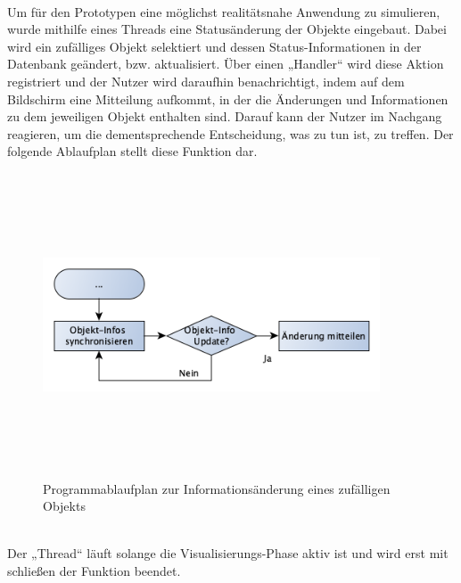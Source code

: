 \\
Um für den Prototypen eine möglichst realitätsnahe Anwendung zu simulieren, wurde mithilfe eines Threads eine Statusänderung der Objekte eingebaut. Dabei wird 
ein zufälliges Objekt selektiert und dessen Status-Informationen in der Datenbank geändert, bzw. aktualisiert. Über einen „Handler“ wird diese Aktion registriert 
und der Nutzer wird daraufhin benachrichtigt, indem auf dem Bildschirm eine Mitteilung aufkommt, in der die Änderungen und Informationen zu dem jeweiligen Objekt 
enthalten sind. Darauf kann der Nutzer im Nachgang reagieren, um die dementsprechende Entscheidung, was zu tun ist, zu treffen. Der folgende Ablaufplan stellt 
diese Funktion dar.
\begin{figure}[hbt!]
    \centering
    \includegraphics[width=10cm,height=9cm,keepaspectratio]{4Umsetzung/Bilder/changeInfoPAP.png}
    \caption{Programmablaufplan zur Informationsänderung eines zufälligen Objekts}
    \label{pic:startmenu}
\end{figure}
\\
Der „Thread“ läuft solange die Visualisierungs-Phase aktiv ist und wird erst mit schließen der Funktion beendet.

